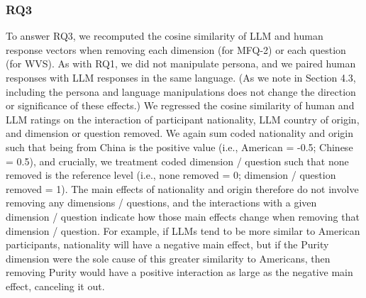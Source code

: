 \documentclass[11pt,a4paper]{article}
\begin{document}
\subsubsection{RQ3}
 To answer RQ3, we recomputed the cosine similarity of LLM and human response vectors when removing each dimension (for MFQ-2) or each question (for WVS). As with RQ1, we did not manipulate persona, and we paired human responses with LLM responses in the same language. (As we note in Section 4.3, including the persona and language manipulations does not change the direction or significance of these effects.) We regressed the cosine similarity of human and LLM ratings on the interaction of participant nationality, LLM country of origin, and dimension or question removed. We again sum coded nationality and origin such that being from China is the positive value (i.e., American = -0.5; Chinese = 0.5), and crucially, we treatment coded dimension / question such that none removed is the reference level (i.e., none removed = 0; dimension / question removed = 1). The main effects of nationality and origin therefore do not involve removing any dimensions / questions, and the interactions with a given dimension / question indicate how those main effects change when removing that dimension / question. For example, if LLMs tend to be more similar to American participants, nationality will have a negative main effect, but if the Purity dimension were the sole cause of this greater similarity to Americans, then removing Purity would have a positive interaction as large as the negative main effect, canceling it out.\\
 
\end{document}
